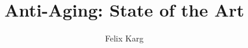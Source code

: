 \usepackage[ngerman, english]{babel}


\title{Anti-Aging: State of the Art}
\author{Felix Karg}


\graphicspath{ {./img/} {../template/} {../template_tex/} } %

\newif\iftwocols
\twocolsfalse
















\appendix
\backupbegin




\backupend


